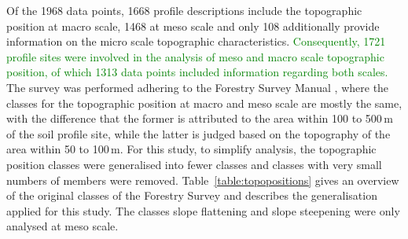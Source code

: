 \documentclass[preprint,12pt,authoryear]{elsarticle}
\begin{document}
Of the 1968 data points, 1668 profile descriptions include  the topographic position at macro scale, 1468 at meso scale and only 108 additionally provide information on the micro scale topographic characteristics.  \textcolor{green}{Consequently, 1721 profile sites were involved in the analysis of meso and macro scale topographic position, of which 1313 data points included information regarding both scales.} The survey was performed adhering to the Forestry Survey Manual \citep{Englisch1998}, where the classes for the topographic position at macro and meso scale are mostly the same, with the difference that the former is attributed to the area within 100 to 500\,m of the soil profile site, while the latter is judged based on the topography of the area within 50 to 100\,m. For this study, to simplify  analysis, the topographic position classes were generalised into fewer classes and classes with very small numbers of members were removed. Table~\ref{table:topopositions} gives an overview of the original classes of the Forestry Survey and describes the generalisation applied for this study. The classes slope flattening and slope steepening were only analysed at meso scale.
\end{document}
